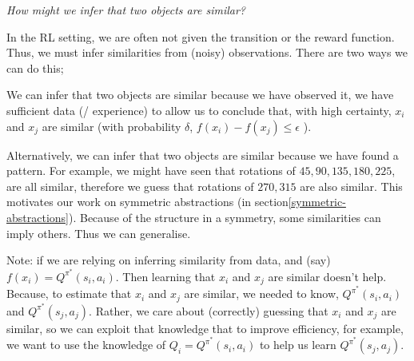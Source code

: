 \begin{displayquote}
	\textsl{How might we infer that two objects are similar?}
\end{displayquote}


In the RL setting, we are often not given the transition or the reward function.
Thus, we must infer similarities from (noisy) observations. There are two ways we can do this;

\hspace{\parindent}We can infer that two objects are similar because we have observed it,
we have sufficient data (/ experience) to allow us to conclude that, with high
certainty, $x_i$ and $x_j$ are similar (with probability $\delta$, $f(x_i) - f(x_j) \le \epsilon$ ).

\hspace{\parindent}Alternatively, we can infer that two objects are similar because we have found a pattern.
For example, we might have seen that rotations of $45, 90, 135$$, 180, 225$, are all similar,
therefore we guess that rotations of $270, 315$ are also similar.
This motivates our work on symmetric abstractions (in section\ref{symmetric-abstractions}).
Because of the structure in a symmetry, some similarities can imply others. Thus we can generalise.

Note: if we are relying on inferring similarity from data, and (say) $f(x_i) = Q^{\pi^{* }}(s_i, a_i)$.
Then learning that $x_i$ and $x_j$ are similar doesn't help.
Because, to estimate that $x_i$ and $x_j$ are similar, we needed to know, $Q^{\pi^{* }}(s_i, a_i)$ and $Q^{\pi^{* }}(s_j, a_j)$.
Rather, we care about (correctly) guessing that $x_i$ and $x_j$ are similar, so we can
exploit that knowledge that to improve efficiency,
for example, we want to use the knowledge of $Q_i = Q^{\pi^{* }}(s_i, a_i)$ to help us learn $Q^{\pi^{* }}(s_j, a_j)$.
